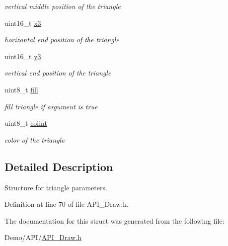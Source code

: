 \begin{DoxyCompactItemize}
\begin{DoxyCompactList}\small\item\em vertical middle position of the triangle \end{DoxyCompactList}\item 
\mbox{\label{struct_t_r_i_a_n_g_l_e_a2f8dbfe5dea533f606bd224181217ad5}} 
uint16\+\_\+t \hyperlink{struct_t_r_i_a_n_g_l_e_a2f8dbfe5dea533f606bd224181217ad5}{x3}
\begin{DoxyCompactList}\small\item\em horizontal end position of the triangle \end{DoxyCompactList}\item 
\mbox{\label{struct_t_r_i_a_n_g_l_e_a2922864d422c08ee7c383363fa3f8923}} 
uint16\+\_\+t \hyperlink{struct_t_r_i_a_n_g_l_e_a2922864d422c08ee7c383363fa3f8923}{y3}
\begin{DoxyCompactList}\small\item\em vertical end position of the triangle \end{DoxyCompactList}\item 
\mbox{\label{struct_t_r_i_a_n_g_l_e_a2ffb43952012965173826ee9554c864a}} 
uint8\+\_\+t \hyperlink{struct_t_r_i_a_n_g_l_e_a2ffb43952012965173826ee9554c864a}{fill}
\begin{DoxyCompactList}\small\item\em fill triangle if argument is true \end{DoxyCompactList}\item 
\mbox{\label{struct_t_r_i_a_n_g_l_e_a21caa4b27a71b7967f1a2d64f196a674}} 
uint8\+\_\+t \hyperlink{struct_t_r_i_a_n_g_l_e_a21caa4b27a71b7967f1a2d64f196a674}{colint}
\begin{DoxyCompactList}\small\item\em color of the triangle \end{DoxyCompactList}\end{DoxyCompactItemize}


\subsection{Detailed Description}
Structure for triangle parameters. 

Definition at line 70 of file A\+P\+I\+\_\+\+Draw.\+h.



The documentation for this struct was generated from the following file\+:\begin{DoxyCompactItemize}
\item 
Demo/\+A\+P\+I/\hyperlink{_a_p_i___draw_8h}{A\+P\+I\+\_\+\+Draw.\+h}\end{DoxyCompactItemize}

